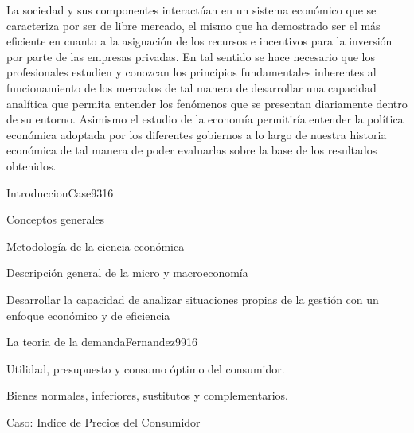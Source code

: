 \begin{syllabus}


\begin{justification}
La sociedad y sus componentes interactúan en un sistema económico que se caracteriza por ser de libre mercado, el mismo que ha demostrado ser el más eficiente en cuanto a la asignación de los recursos e incentivos para la inversión por parte de las empresas privadas. En tal sentido se hace necesario que los profesionales estudien y conozcan los principios fundamentales inherentes al funcionamiento de los mercados de tal manera de desarrollar una capacidad analítica que permita entender los fenómenos que se presentan diariamente dentro de su entorno. Asimismo el estudio de la economía permitiría entender la política económica adoptada por los diferentes gobiernos a lo largo de nuestra historia económica de tal manera de poder evaluarlas sobre la base de los resultados obtenidos.
\end{justification}

\begin{goals}
\item \OutcomeHU
\end{goals}

\begin{outcomes}
\end{outcomes}

\begin{unit}{Introduccion}{Case93}{16}
\begin{topics}
	\item Conceptos generales
	\item Metodología de la ciencia económica
	\item Descripción general de la micro y macroeconomía
\end{topics}

\begin{learningoutcomes}
      \item Desarrollar la capacidad de analizar situaciones propias de la gestión con un enfoque económico y de eficiencia
   \end{learningoutcomes}
\end{unit}

\begin{unit}{La teoria de la demanda}{Fernandez99}{16}
\begin{topics}
	\item  Utilidad, presupuesto y consumo óptimo del consumidor.
	\item Bienes normales, inferiores, sustitutos y complementarios.
 	\item Caso: Indice de Precios del Consumidor
\end{topics}


\end{unit}
\end{syllabus}
